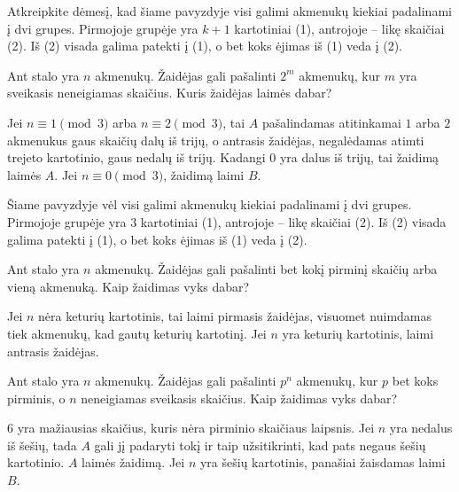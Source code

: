 Atkreipkite dėmesį, kad šiame pavyzdyje visi galimi akmenukų kiekiai
padalinami į dvi grupes. Pirmojoje grupėje yra $k+1$ kartotiniai (1),
antrojoje – likę skaičiai (2). Iš (2) visada galima patekti į (1), o bet
koks ėjimas iš (1) veda į (2). 

\begin{pavnr}
  Ant stalo yra $n$ akmenukų. Žaidėjas gali pašalinti $2^{m}$ akmenukų, kur
  $m$ yra sveikasis neneigiamas skaičius. Kuris žaidėjas laimės dabar?
\end{pavnr}

\begin{sprendimas}
  Jei $n \equiv 1 \pmod{3}$ arba $n \equiv 2 \pmod{3}$, tai $A$ pašalindamas
  atitinkamai $1$ arba $2$ akmenukus gaus skaičių dalų iš trijų, o antrasis
  žaidėjas, negalėdamas atimti trejeto kartotinio, gaus nedalų iš trijų.
  Kadangi $0$ yra dalus iš trijų, tai žaidimą laimės $A$. Jei $n \equiv 0
  \pmod{3}$, žaidimą laimi $B$.
\end{sprendimas}

Šiame pavyzdyje vėl visi galimi akmenukų kiekiai padalinami į dvi grupes.
Pirmojoje grupėje yra $3$ kartotiniai (1), antrojoje – likę skaičiai (2).
Iš (2) visada galima patekti į (1), o bet koks ėjimas iš (1) veda į (2).

\begin{pavnr}
  Ant stalo yra $n$ akmenukų. Žaidėjas gali pašalinti bet kokį pirminį skaičių
  arba vieną akmenuką. Kaip žaidimas vyks dabar?
\end{pavnr}

\begin{sprendimas}
  Jei $n$ nėra keturių kartotinis, tai laimi pirmasis žaidėjas, visuomet nuimdamas tiek
  akmenukų, kad gautų keturių kartotinį. Jei $n$ yra keturių kartotinis, laimi
  antrasis žaidėjas. 
\end{sprendimas}

\begin{pavnr}
  Ant stalo yra $n$ akmenukų. Žaidėjas gali pašalinti $p^n$ akmenukų, kur
  $p$ bet koks pirminis, o $n$ neneigiamas sveikasis  skaičius. Kaip
  žaidimas vyks dabar?  
\end{pavnr}

\begin{sprendimas}
  $6$ yra mažiausias skaičius, kuris nėra pirminio skaičiaus laipsnis. Jei $n$
  yra nedalus iš šešių, tada $A$ gali jį padaryti tokį ir taip užsitikrinti,
  kad pats negaus šešių kartotinio. $A$ laimės žaidimą. Jei $n$ yra šešių
  kartotinis, panašiai žaisdamas laimi $B$.
\end{sprendimas}

